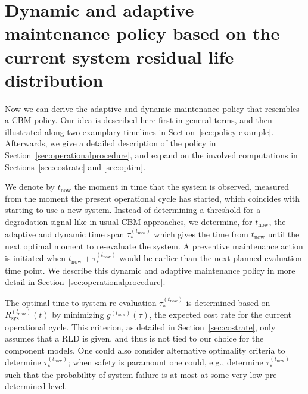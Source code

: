 \documentclass[authoryear]{elsarticle}
\def\tnow{t_\text{now}}
\newcommand{\Rsysnow}{R^{(t_\text{now})}_\text{sys}}
\newcommand{\gnow}{g^{(\tnow)}}
\newcommand{\tausnow}{\tau_*^{(\tnow)}}
\begin{document}
\section{Dynamic and adaptive maintenance policy based on the current system residual life distribution}
\label{sec:policy}

Now we can derive the adaptive and dynamic maintenance policy
that resembles a CBM policy.
Our idea is described here first in general terms,
and then illustrated along two examplary timelines in Section~\ref{sec:policy-example}.
Afterwards, we give a detailed description of the policy in Section~\ref{sec:operationalprocedure},
and expand on the involved computations in Sections~\ref{sec:costrate} and \ref{sec:optim}.

We denote by $\tnow$ the moment in time that the system is observed,
measured from the moment the present operational cycle has started,
which coincides with starting to use a new system.
Instead of determining a threshold for a degradation signal like in usual CBM approaches,
we determine, for $\tnow$, the adaptive and dynamic time span $\tausnow$
which gives the time from $\tnow$ until the next optimal moment to re-evaluate the system.
A preventive maintenance action is initiated
when $\tnow + \tausnow$ would be earlier than the next planned evaluation time point.
We describe this dynamic and adaptive maintenance policy in more detail in Section~\ref{sec:operationalprocedure}.

The optimal time to system re-evaluation $\tausnow$ is determined based on $\Rsysnow(t)$
by minimizing $\gnow(\tau)$, the expected cost rate for the current operational cycle.
This criterion, as detailed in Section~\ref{sec:costrate},
only assumes that a RLD is given,
and thus is not tied to our choice for the component models.
One could also consider alternative optimality criteria to determine $\tausnow$;
when safety is paramount one could, e.g., determine $\tausnow$ such that
the probability of system failure is at most at some very low pre-determined level.
\end{document}
